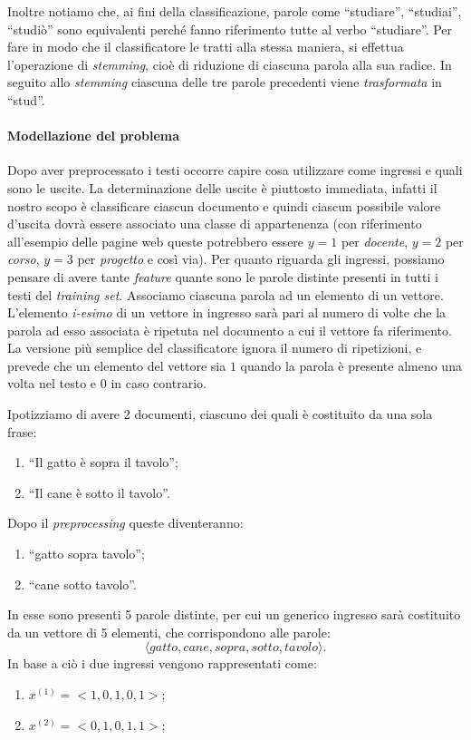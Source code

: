 Inoltre notiamo che, ai fini della classificazione, parole come ``studiare'', ``studiai'', ``studiò'' sono equivalenti  perché fanno riferimento tutte al verbo ``studiare''. Per fare in modo che il classificatore le tratti alla stessa maniera, si effettua l'operazione di \emph{stemming}, cioè di riduzione di ciascuna parola alla sua radice. In seguito allo \emph{stemming} ciascuna delle tre parole precedenti viene \emph{trasformata} in ``stud''.

\paragraph{Modellazione del problema}
Dopo aver preprocessato i testi occorre capire cosa utilizzare come ingressi e quali sono le uscite. La determinazione delle uscite è piuttosto immediata, infatti il nostro scopo è classificare ciascun documento e quindi ciascun possibile valore d'uscita dovrà essere associato una classe di appartenenza (con riferimento all'esempio delle pagine web queste potrebbero essere  $y=1$ per \emph{docente}, $y=2$ per \emph{corso}, $y=3$ per \emph{progetto} e così via). Per quanto riguarda gli ingressi, possiamo pensare di avere tante \emph{feature} quante sono le parole distinte presenti in tutti i testi del \emph{training set}. Associamo ciascuna parola ad un elemento di un vettore. L'elemento \emph{i-esimo} di un vettore in ingresso sarà pari al numero di volte che la parola ad esso  associata è ripetuta nel documento a cui il vettore fa riferimento. La versione più semplice del classificatore ignora il numero di ripetizioni, e prevede che un elemento del vettore sia $1$ quando la parola è presente almeno una volta nel testo e $0$ in caso contrario.


\begin{esempio}
Ipotizziamo di avere 2 documenti, ciascuno dei quali è costituito da una sola frase:
\begin{enumerate}
\item ``Il gatto è sopra il tavolo'';
\item ``Il cane è sotto il tavolo''.
\end{enumerate}
Dopo il \emph{preprocessing} queste diventeranno:
\begin{enumerate}
\item ``gatto sopra tavolo'';
\item ``cane sotto tavolo''.
\end{enumerate}
In esse sono presenti 5 parole distinte, per cui un generico ingresso sarà costituito da un vettore di 5 elementi, che corrispondono alle parole:
\begin{equation*}
\langle gatto, cane, sopra, sotto, tavolo \rangle.
\end{equation*}
In base a ciò i due ingressi vengono rappresentati come:
\begin{enumerate}
\item $x^{(1)} = <1,0,1,0,1>$;
\item $x^{(2)} = <0,1,0,1,1>$;
\end{enumerate}
\end{esempio}

